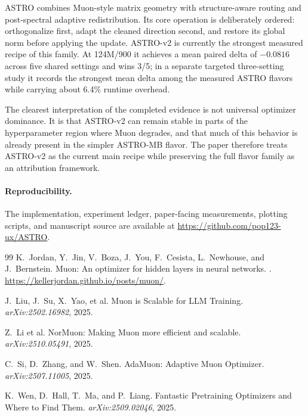 \documentclass[10pt,twocolumn]{article}
\begin{document}
ASTRO combines Muon-style matrix geometry with structure-aware routing and
post-spectral adaptive redistribution. Its core operation is deliberately
ordered: orthogonalize first, adapt the cleaned direction second, and restore
its global norm before applying the update. ASTRO-v2 is currently the strongest
measured recipe of this family. At 124M/900 it achieves a mean paired delta of
$-0.0816$ across five shared settings and wins 3/5; in a separate targeted
three-setting study it records the strongest mean delta among the measured
ASTRO flavors while carrying about 6.4\% runtime overhead.

The clearest interpretation of the completed evidence is not universal
optimizer dominance. It is that ASTRO-v2 can remain stable in parts of the
hyperparameter region where Muon degrades, and that much of this behavior is
already present in the simpler ASTRO-MB flavor. The paper therefore treats
ASTRO-v2 as the current main recipe while preserving the full flavor family as
an attribution framework.

\paragraph{Reproducibility.}
The implementation, experiment ledger, paper-facing measurements, plotting
scripts, and manuscript source are available at
\url{https://github.com/pop123-ux/ASTRO}.

\begin{thebibliography}{99}
K.~Jordan, Y.~Jin, V.~Boza, J.~You, F.~Cesista, L.~Newhouse, and J.~Bernstein.
\newblock Muon: An optimizer for hidden layers in neural networks.
. \url{https://kellerjordan.github.io/posts/muon/}.

J.~Liu, J.~Su, X.~Yao, et al.
\newblock Muon is Scalable for LLM Training.
\newblock \emph{arXiv:2502.16982}, 2025.

Z.~Li et al.
\newblock NorMuon: Making Muon more efficient and scalable.
\newblock \emph{arXiv:2510.05491}, 2025.

C.~Si, D.~Zhang, and W.~Shen.
\newblock AdaMuon: Adaptive Muon Optimizer.
\newblock \emph{arXiv:2507.11005}, 2025.

K.~Wen, D.~Hall, T.~Ma, and P.~Liang.
\newblock Fantastic Pretraining Optimizers and Where to Find Them.
\newblock \emph{arXiv:2509.02046}, 2025.
\end{thebibliography}
\end{document}
